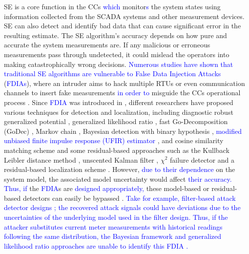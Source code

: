 SE is a core function in the CCs \textcolor{blue}{which} monitor\textcolor{blue}{s} the system states using information collected from the SCADA systems and other measurement devices. SE can also detect and identify bad data that can cause significant error in the resulting estimate. The SE algorithm's accuracy depends on how pure and accurate the system measurements are. If any malicious or erroneous measurements pass through undetected, it could mislead the operators into making catastrophically wrong decisions. \textcolor{blue}{Numerous studies have shown that traditional SE algorithms are vulnerable to False Data Injection Attacks} (\textcolor{blue}{FDIAs}), where an intruder aims to hack multiple RTUs or even communication channels to insert fake measurements \textcolor{blue}{in order to} misguide the CCs operational process \cite{liu2011false, boba, sou, kordestani2021observer}. Since \textcolor{blue}{FDIA} was introduced in \cite{liu2011false}, different researchers have proposed various techniques for detection and localization, including diagnostic robust generalized potential \cite{majumdar2016bad}, generalized likelihood ratio \cite{tang2016detection}, fast Go-Decomposition (GoDec) \cite{li2018detecting}, Markov chain \cite{li2017hmm}, Bayesian detection with binary hypothesis \cite{ding2018survey}, \textcolor{blue}{modified unbiased finite impulse response (UFIR) estimator \cite{ju2020deception}}, and cosine similarity matching scheme \cite{rawat2015detection} and some residual-based approaches such as the Kullback Leibler distance method \cite{chaojun2015detecting}, unscented Kalman filter \cite{vzivkovic2018detection}, $\chi^2$ failure detector \cite{mo2010false} and a residual-based localization scheme \cite{zheng2021Resilient}. However, \textcolor{blue}{due to their dependence} on the system model, the associated model uncertainty would affect \textcolor{blue}{their accuracy. Thus, if} the \textcolor{blue}{FDIA}s are \textcolor{blue}{designed appropriately,} these model-based or residual-based detectors can easily be bypassed \cite{liu2011false, zheng2021Resilient}. \textcolor{blue}{Take for example, filter-based attack detector designs \cite{ju2020deception, vzivkovic2018detection}; the recovered attack signals could have deviations due to the uncertainties of the underlying model used in the filter design. Thus, if the attacker substitutes current meter measurements with historical readings following the same distribution, the Bayesian framework and generalized likelihood ratio approaches are unable to identify this FDIA \cite{singh2017joint}.}

